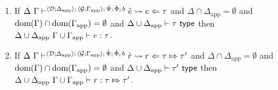 \begin{theorem}
\begin{enumerate}
\begin{enumerate}
\begin{enumerate}
      \item If $\Delta~\Gamma \vdash^{\langle \mathcal{D}; \Delta_\text{app} \rangle;\,\langle \mathcal{G}; \Gamma_\text{app} \rangle;\,\hat{\Psi};\,\hat\Phi;\,b} \grave{e} \leadsto e \Leftarrow \tau$ and $\Delta \cap \Delta_\text{app}=\emptyset$ and $\text{dom}(\Gamma) \cap \text{dom}(\Gamma_\text{app})=\emptyset$ and ${\Delta}\cup{\Delta_\text{app}} \vdash \tau~\mathsf{type}$ then ${\Delta}\cup{\Delta_\text{app}}~{\Gamma}\cup{\Gamma_\text{app}} \vdash e : \tau$. 
      \item If $\Delta~\Gamma \vdash^{\langle \mathcal{D}; \Delta_\text{app} \rangle;\,\langle \mathcal{G}; \Gamma_\text{app} \rangle;\,\hat{\Psi};\,\hat\Phi;\,b} \grave{r} \leadsto r \Leftarrow \tau \Mapsto \tau'$ and $\Delta \cap \Delta_\text{app}=\emptyset$ and $\text{dom}(\Gamma) \cap \text{dom}(\Gamma_\text{app})=\emptyset$ and ${\Delta}\cup{\Delta_\text{app}} \vdash \tau'~\mathsf{type}$ then ${\Delta}\cup{\Delta_\text{app}}~{\Gamma}\cup{\Gamma_\text{app}} \vdash r : \tau \Mapsto \tau'$.
    \end{enumerate}
  \end{enumerate}
\end{enumerate}
\end{theorem}
